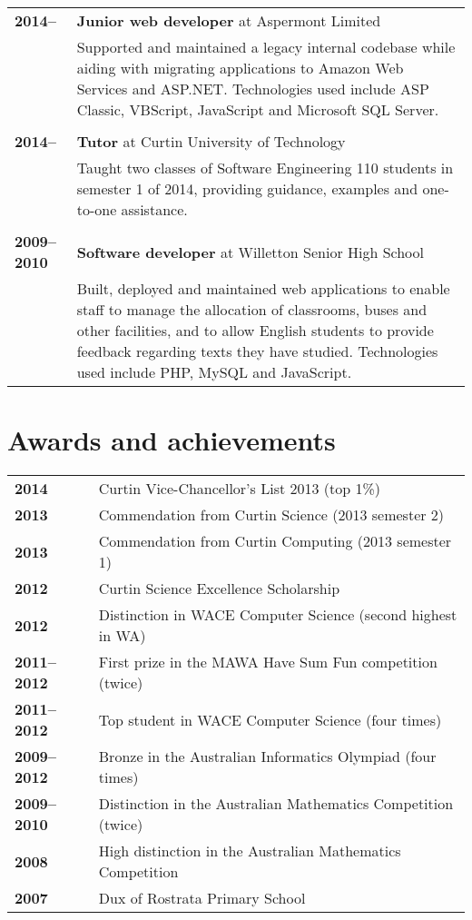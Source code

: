 \documentclass[a4paper,12pt]{article}
\begin{document}
\begin{tabular}{p{3.5cm}p{12.5cm}}
	\textbf{2014--} &
		\textbf{Junior web developer} at Aspermont Limited\\ &
		Supported and maintained a legacy internal codebase while
		aiding with migrating applications to Amazon Web Services and
		ASP.NET. Technologies used include ASP Classic, VBScript,
		JavaScript and Microsoft SQL Server.\\\\
	\textbf{2014--} &
		\textbf{Tutor} at Curtin University of Technology\\ &
		Taught two classes of Software Engineering 110 students in
		semester 1 of 2014, providing guidance, examples and one-to-one
		assistance.\\\\
	\textbf{2009--2010} &
		\textbf{Software developer} at Willetton Senior High School\\ &
		Built, deployed and maintained web applications to enable staff
		to manage the allocation of classrooms, buses and other
		facilities, and to allow English students to provide feedback
		regarding texts they have studied. Technologies used include
		PHP, MySQL and JavaScript.\\
\end{tabular}

\section*{Awards and achievements}

\begin{tabular}{p{3.5cm}p{12.5cm}}
	\textbf{2014} &
		Curtin Vice-Chancellor's List 2013 (top 1\%) \\
	\textbf{2013} &
		Commendation from Curtin Science (2013 semester 2) \\
	\textbf{2013} &
		Commendation from Curtin Computing (2013 semester 1) \\
	\textbf{2012} &
		Curtin Science Excellence Scholarship \\
	\textbf{2012} &
		Distinction in WACE Computer Science (second highest in WA) \\
	\textbf{2011--2012} &
		First prize in the MAWA Have Sum Fun competition (twice) \\
	\textbf{2011--2012} &
		Top student in WACE Computer Science (four times) \\
	\textbf{2009--2012} &
		Bronze in the Australian Informatics Olympiad (four times) \\
	\textbf{2009--2010} &
		Distinction in the Australian Mathematics Competition (twice) \\
	\textbf{2008} &
		High distinction in the Australian Mathematics Competition \\
	\textbf{2007} &
		Dux of Rostrata Primary School \\
\end{tabular}
\end{document}
